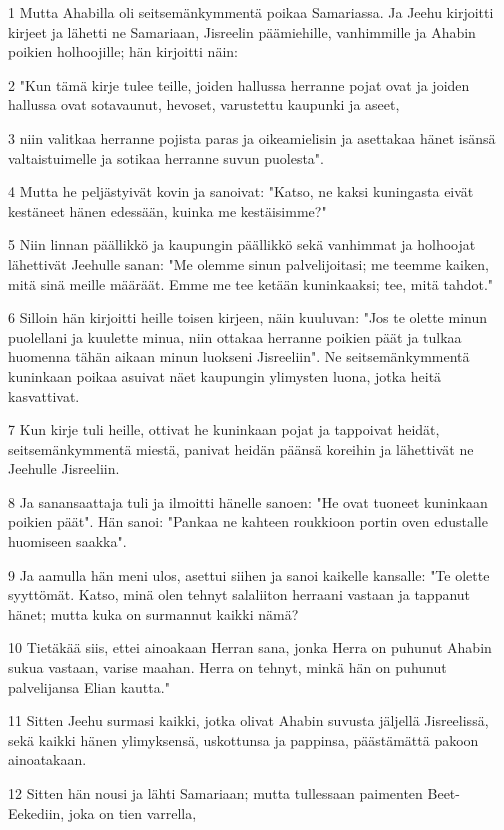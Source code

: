 \par 1 Mutta Ahabilla oli seitsemänkymmentä poikaa Samariassa. Ja Jeehu kirjoitti kirjeet ja lähetti ne Samariaan, Jisreelin päämiehille, vanhimmille ja Ahabin poikien holhoojille; hän kirjoitti näin:
\par 2 "Kun tämä kirje tulee teille, joiden hallussa herranne pojat ovat ja joiden hallussa ovat sotavaunut, hevoset, varustettu kaupunki ja aseet,
\par 3 niin valitkaa herranne pojista paras ja oikeamielisin ja asettakaa hänet isänsä valtaistuimelle ja sotikaa herranne suvun puolesta".
\par 4 Mutta he peljästyivät kovin ja sanoivat: "Katso, ne kaksi kuningasta eivät kestäneet hänen edessään, kuinka me kestäisimme?"
\par 5 Niin linnan päällikkö ja kaupungin päällikkö sekä vanhimmat ja holhoojat lähettivät Jeehulle sanan: "Me olemme sinun palvelijoitasi; me teemme kaiken, mitä sinä meille määräät. Emme me tee ketään kuninkaaksi; tee, mitä tahdot."
\par 6 Silloin hän kirjoitti heille toisen kirjeen, näin kuuluvan: "Jos te olette minun puolellani ja kuulette minua, niin ottakaa herranne poikien päät ja tulkaa huomenna tähän aikaan minun luokseni Jisreeliin". Ne seitsemänkymmentä kuninkaan poikaa asuivat näet kaupungin ylimysten luona, jotka heitä kasvattivat.
\par 7 Kun kirje tuli heille, ottivat he kuninkaan pojat ja tappoivat heidät, seitsemänkymmentä miestä, panivat heidän päänsä koreihin ja lähettivät ne Jeehulle Jisreeliin.
\par 8 Ja sanansaattaja tuli ja ilmoitti hänelle sanoen: "He ovat tuoneet kuninkaan poikien päät". Hän sanoi: "Pankaa ne kahteen roukkioon portin oven edustalle huomiseen saakka".
\par 9 Ja aamulla hän meni ulos, asettui siihen ja sanoi kaikelle kansalle: "Te olette syyttömät. Katso, minä olen tehnyt salaliiton herraani vastaan ja tappanut hänet; mutta kuka on surmannut kaikki nämä?
\par 10 Tietäkää siis, ettei ainoakaan Herran sana, jonka Herra on puhunut Ahabin sukua vastaan, varise maahan. Herra on tehnyt, minkä hän on puhunut palvelijansa Elian kautta."
\par 11 Sitten Jeehu surmasi kaikki, jotka olivat Ahabin suvusta jäljellä Jisreelissä, sekä kaikki hänen ylimyksensä, uskottunsa ja pappinsa, päästämättä pakoon ainoatakaan.
\par 12 Sitten hän nousi ja lähti Samariaan; mutta tullessaan paimenten Beet-Eekediin, joka on tien varrella,
